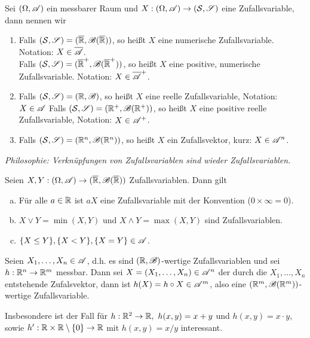 \documentclass{scrartcl}
\begin{document}
    \begin{defn}
        Sei $(\Omega,\mathscr{A})$ ein messbarer Raum und $X:(\Omega,\mathscr{A})\to(\mathcal{S},\mathscr{S})$ eine Zufallsvariable, dann nennen wir
        \begin{enumerate}[(1)]
            \item Falls $(\mathcal{S},\mathscr{S})=(\overline{\mathbb{R}},\mathscr{B}(\overline{\mathbb{R}}))$, so heißt $X$ eine numerische Zufallsvariable. Notation: $X\in \overline{\mathscr{A}}$. \\
            Falls $(\mathcal{S},\mathscr{S})=(\overline{\mathbb{R}}^+,\mathscr{B}(\overline{\mathbb{R}}^+))$, so heißt $X$ eine positive, numerische Zufallsvariable. Notation: $X\in \overline{\mathscr{A}}^+$.
            \item Falls $(\mathcal{S},\mathscr{S})=(\mathbb{R},\mathscr{B})$, so heißt $X$ eine reelle Zufallsvariable, Notation: $X\in \mathscr{A}$
            Falls $(\mathcal{S},\mathscr{S})=(\mathbb{R}^+,\mathscr{B}(\mathbb{R}^+))$, so heißt $X$ eine positive reelle Zufallsvariable, Notation: $X\in \mathscr{A}^+$.
            \item Falls $(\mathcal{S},\mathscr{S})=(\mathbb{R}^n,\mathscr{B}(\mathbb{R}^n))$, so heißt $X$ ein Zufallsvektor, kurz: $X\in \mathscr{A}^n$.
        \end{enumerate} 
    \end{defn}
    \textit{Philosophie: Verknüpfungen von Zufallsvariablen sind wieder Zufallsvariablen.
    }\begin{lemma}
        Seien $X,Y:(\Omega,\mathscr{A})\to(\overline{\mathbb{R}},\mathscr{B}(\overline{\mathbb{R}}))$ Zufallsvariablen. Dann gilt
        \begin{enumerate}[(a)]
            \item Für alle $a\in \mathbb{R}$ ist $aX$ eine Zufallsvariable mit der Konvention ($0\times \infty =0$).
            \item $X\lor Y=\min(X,Y)$ und $X\land Y=\max(X,Y)$ sind Zufallsvariablen.
            \item $\{X\le Y\}, \{X<Y\}, \{X=Y\}\in \mathscr{A}$.
        \end{enumerate}
    \end{lemma}
    \begin{lemma} Seien $X_1,\ldots,X_n\in \mathscr{A}$, d.h. es sind $(\mathbb{R},\mathscr{B})$-wertige Zufallsvariablen und sei $h:\mathbb{R}^n\to \mathbb{R}^m$ messbar. Dann sei $X=(X_1,\ldots,X_n)\in \mathscr{A}^n$ der durch die $X_1,\ldots,X_n$ entstehende Zufalsvektor, dann ist $h(X) = h\circ X \in \mathscr{A}^m$, also eine $(\mathbb{R}^m,\mathscr{B}(\mathbb{R}^m))$-wertige Zufallsvariable.
    \end{lemma} Insbesondere ist der Fall für $h:\mathbb{R}^2\to \mathbb{R}, \ h(x,y)=x+y$ und $h(x,y)=x\cdot y$, sowie $h':\mathbb{R}\times\mathbb{R}\setminus\{0\}\to \mathbb{R}$ mit $h(x,y)= x/y$ interessant. 
\end{document}
